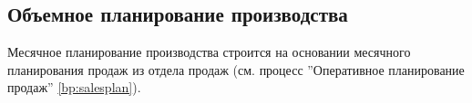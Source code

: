 \newpage
\subsection{Объемное планирование производства}
\label{bp:MonthPlan}


Месячное планирование производства строится на основании месячного планирования продаж из отдела продаж (см. процесс ''Оперативное планирование продаж'' \ref{bp:salesplan}).









% 